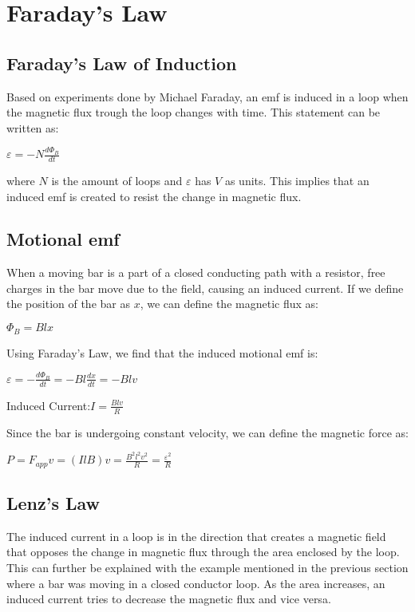 \documentclass{report}
\begin{document}
\chapter{Faraday's Law}
	\section{Faraday's Law of Induction}
		Based on experiments done by Michael Faraday, an emf is induced in a loop when the magnetic flux trough the loop changes with time. This statement can be written as:\\
		\centerline{$\varepsilon = -N\frac{d\Phi_B}{dt}$}
		where $N$ is the amount of loops and $\varepsilon$ has $V$ as units. This implies that an induced emf is created to resist the change in magnetic flux.
	\section{Motional emf}
		When a moving bar is a part of a closed conducting path with a resistor, free charges in the bar move due to the field, causing an induced current. If we define the position of the bar as $x$, we can define the magnetic flux as:\\
		\centerline{$\Phi_B = Blx$}
		Using Faraday's Law, we find that the induced motional emf is:\\
		\centerline{$\varepsilon = -\frac{d\Phi_B}{dt} = -Bl\frac{dx}{dt} = -Blv$}
		\centerline{Induced Current:$I = \frac{Blv}{R}$}
		Since the bar is undergoing constant velocity, we can define the magnetic force as:\\
		\centerline{$P = F_{app}v = (IlB)v = \frac{B^2l^2v^2}{R} = \frac{\varepsilon^2}{R}$}
	\section{Lenz's Law}
		The induced current in a loop is in the direction that creates a magnetic field that opposes the change in magnetic flux through the area enclosed by the loop.\\
		This can further be explained with the example mentioned in the previous section where a bar was moving in a closed conductor loop. As the area increases, an induced current tries to decrease the magnetic flux and vice versa.
\end{document}

